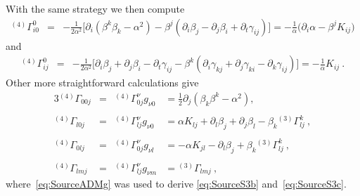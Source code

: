 \documentclass{article}
\begin{document}
%
With the same strategy we then compute
%
\begin{eqnarray}
  \label{eq:SourceChr1a}
  {}^{(4)}\Gamma^0_{i0} & = & - \frac{1}{2\alpha^2} \Big[
      \partial_i (\beta^k \beta_k - \alpha^2) - \beta^j (\partial_i
      \beta_j - \partial_j \beta_i + \partial_t \gamma_{ij}) \Big] = - \frac{1}{\alpha} \Big(\partial_i\alpha - \beta^j K_{ij}\Big)
\end{eqnarray}
%
and
%
\begin{eqnarray}
\label{eq:SourceChr0ij}
  {}^{(4)}\Gamma^0_{ij} & = & - \frac{1}{2\alpha^2} \Big[
      \partial_i\beta_j + \partial_j\beta_i - \partial_t\gamma_{ij} - \beta^k
  (\partial_i\gamma_{kj} + \partial_j\gamma_{ki} - \partial_k\gamma_{ij})\Big] = -
  \frac{1}{\alpha} K_{ij}\ .
\end{eqnarray}
%
Other more straightforward calculations give
%
\begin{alignat}{3}
  \label{eq:SourceS3a}
  {}^{(4)}\Gamma_{00j} &=& {}^{(4)}\Gamma^\nu_{0j}g_{\nu 0} & =  \frac{1}{2} \partial_j \left( \beta_k
    \beta^k - \alpha^2 \right), \\
\nonumber\\
  \label{eq:SourceS3b}
  {}^{(4)}\Gamma_{l0j} &=& {}^{(4)}\Gamma^\nu_{lj}g_{\nu 0} & =  \alpha K_{lj} + \partial_l\beta_j + \partial_j\beta_l - \beta_k{}^{(3)}\Gamma^k_{lj}\ , \\
\nonumber\\
  \label{eq:SourceS3c}
  {}^{(4)}\Gamma_{0lj} &=& {}^{(4)}\Gamma^\nu_{0j}g_{\nu l} & =  -\alpha K_{jl} - \partial_l\beta_j + \beta_k {}^{(3)}\Gamma^k_{lj}\ , \\
\nonumber\\
  \label{eq:SourceS3d}
  {}^{(4)}\Gamma_{lmj} &=& {}^{(4)}\Gamma^\nu_{lj}g_{\nu m} & =  {}^{(3)}\Gamma_{lmj}\ ,
\end{alignat}
%
where~\eqref{eq:SourceADMg} was used to derive \eqref{eq:SourceS3b}
and~\eqref{eq:SourceS3c}.
\end{document}
